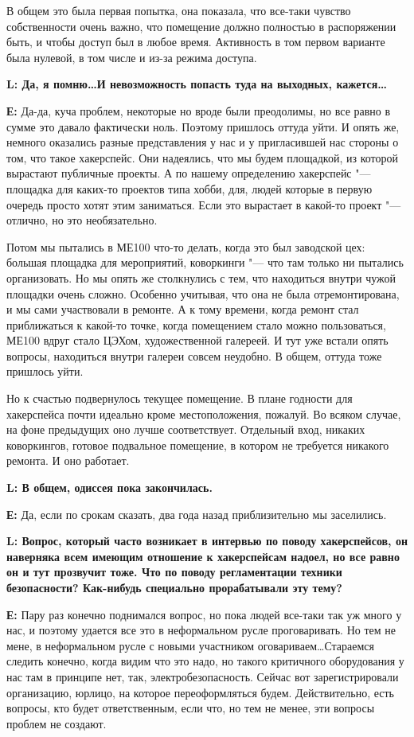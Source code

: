 \documentclass[10pt, a5paper]{article}
\begin{document}
В общем это была первая попытка, она показала, что все-таки чувство собственности очень важно, что помещение должно полностью в распоряжении быть, и чтобы доступ был в любое время. Активность в том первом варианте была нулевой, в том числе и из-за режима доступа.

{\noindent \bf L: Да, я помню\ldots И невозможность попасть туда на выходных, кажется\ldots}

{\noindent \bf Е:} Да-да, куча проблем, некоторые но вроде были преодолимы, но все равно в сумме это давало фактически ноль. Поэтому пришлось оттуда уйти. И опять же, немного оказались разные представления у нас и у пригласившей нас стороны о том, что такое хакерспейс. Они надеялись, что мы будем площадкой, из которой вырастают публичные проекты. А по нашему определению хакерспейс "--- площадка для каких-то проектов типа хобби, для, людей которые в первую очередь просто хотят этим заниматься. Если это вырастает в какой-то проект "--- отлично, но это необязательно. 

Потом мы пытались в МЕ100 что-то делать, когда это был заводской цех: большая площадка для мероприятий, коворкинги "--- что там только ни пытались организовать. Но мы опять же столкнулись с тем, что находиться внутри чужой площадки очень сложно.  Особенно учитывая, что она не была отремонтирована, и мы сами участвовали в ремонте. А к тому времени, когда ремонт стал приближаться к какой-то точке, когда помещением стало можно пользоваться, МЕ100 вдруг стало ЦЭХом, художественной галереей. И тут уже встали опять вопросы, находиться внутри галереи совсем неудобно. В общем, оттуда тоже пришлось уйти.

Но к счастью подвернулось текущее помещение. В плане годности для хакерспейса почти идеально кроме местоположения, пожалуй. Во всяком случае, на фоне предыдущих оно лучше соответствует. Отдельный вход, никаких коворкингов, готовое подвальное помещение, в котором не требуется никакого ремонта. И оно работает. 

{\noindent \bf L: В общем, одиссея пока закончилась.}

{\noindent \bf Е:} Да, если по срокам сказать, два года назад приблизительно мы заселились.

{\noindent \bf L: Вопрос, который часто возникает в интервью по поводу хакерспейсов, он наверняка всем имеющим отношение к хакерспейсам надоел, но все равно он и тут прозвучит тоже. Что по поводу регламентации техники безопасности? Как-нибудь специально прорабатывали эту тему? }

{\noindent \bf Е:} Пару раз конечно поднимался вопрос, но пока людей все-таки так уж много у нас, и поэтому удается все это в неформальном русле проговаривать.  Но тем не мене, в неформальном русле с новыми участником оговариваем\ldots Стараемся следить конечно, когда видим что это надо, но такого критичного оборудования у нас там в принципе нет, так, электробезопасность. Сейчас вот зарегистрировали организацию, юрлицо, на которое переоформляться будем. Действительно, есть вопросы, кто будет ответственным, если что, но тем  не менее, эти вопросы проблем не создают.
\end{document}
